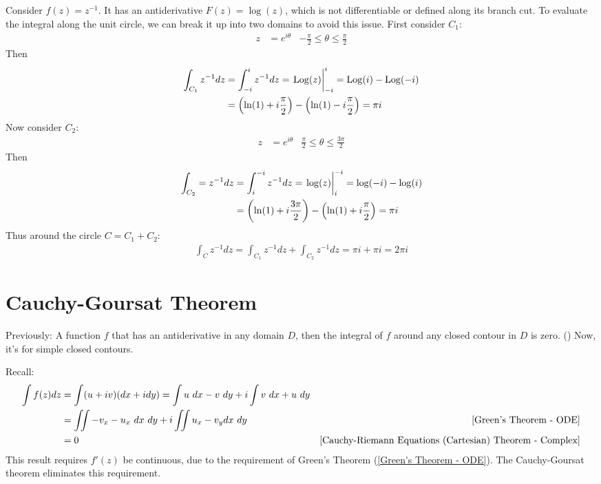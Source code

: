 \documentclass[12pt, english]{book}
\DeclareMathOperator\Log{Log}
\begin{document}
	\begin{example}
		Consider \(f(z) = z^{-1}\). It has an antiderivative \(F(z) = \log(z)\), which is not differentiable or defined along its branch cut. To evaluate the integral along the unit circle, we can break it up into two domains to avoid this issue. First consider \(C_1\):
		\begin{align*}
			z &= e^{i\theta} & -\frac{\pi}{2} \leq \theta \leq \frac{\pi}{2}
		\end{align*}
		Then  
		\begin{align*}
			\int_{C_1} z^{-1} dz
			&= \int_{-i}^{i} z^{-1} dz = \eval{\Log(z)}_{-i}^{i} = \Log(i) - \Log(-i) \\
			&= \left(\ln(1) + i\frac{\pi}{2}\right) - \left(\ln(1) - i\frac{\pi}{2}\right) = \pi i
		\end{align*}
		Now consider \(C_2\):
		\begin{align*}
			z &= e^{i\theta} & \frac{\pi}{2} \leq \theta \leq \frac{3\pi}{2}
		\end{align*}
		Then 
		\begin{align*}
			\int_{C_2} = z^{-1} dz 
			&= \int_{i}^{-i} z^{-1} dz = \eval{\log(z)}_{i}^{-i} = \log(-i) - \log(i) \\
			&= \left(\ln(1) + i\frac{3\pi}{2}\right) - \left(\ln(1) + i\frac{\pi}{2}\right) = \pi i
		\end{align*}
		Thus around the circle \(C = C_1 + C_2\):
		\begin{align*}
			\int_{C} z^{-1} dz = \int_{C_1} z^{-1} dz + \int_{C_2} z^{-1} dz = \pi i + \pi i = 2 \pi i
		\end{align*}
	\end{example}
	
	\section{Cauchy-Goursat Theorem} \label{Cauchy-Goursat Theorem Section - Complex}
	
	Previously: A function \(f\) that has an antiderivative in any domain \(D\), then the integral of \(f\) around any closed contour in \(D\) is zero. () Now, it's for simple closed contours. 
	
	Recall:
	\begin{align*}
		\int f(z) dz 
		&= \int (u + iv)(dx + i dy) = \int u \ dx - v \ dy + i\int v \ dx + u \ dy \\
		&= \iint -v_x - u_x \ dx \ dy + i \iint u_x - v_y dx \ dy 
			& \Cref{Green's Theorem - ODE} \\
		&= 0 & \Cref{Cauchy-Riemann Equations (Cartesian) Theorem - Complex}
	\end{align*}
	This result requires \(f'(z)\) be continuous, due to the requirement of Green's Theorem (\cref{Green's Theorem - ODE}). The Cauchy-Goursat theorem eliminates this requirement.
	
\end{document}
